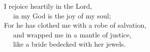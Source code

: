
\lettrine{I}{} rejoice heartily in the Lord,\\
   in my God is the joy of my soul;\\
For he has clothed me with a robe of salvation,\\
   and wrapped me in a mantle of justice,\\
   like a bride bedecked with her jewels.
